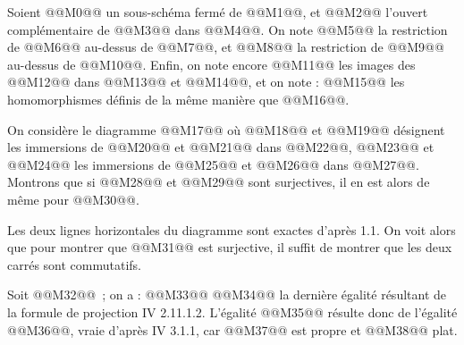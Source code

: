
Soient @@M0@@ un sous-schéma fermé de @@M1@@, et @@M2@@ l'ouvert complémentaire de @@M3@@ dans @@M4@@. On note @@M5@@ la restriction de @@M6@@ au-dessus de @@M7@@, et @@M8@@ la restriction de @@M9@@ au-dessus de @@M10@@. Enfin, on note encore @@M11@@ les images des @@M12@@ dans @@M13@@ et @@M14@@, et on note :
@@M15@@
les homomorphismes définis de la même manière que @@M16@@.

On considère le diagramme
@@M17@@
où @@M18@@ et @@M19@@ désignent les immersions de @@M20@@ et @@M21@@ dans @@M22@@, @@M23@@ et @@M24@@ les immersions de @@M25@@ et @@M26@@ dans @@M27@@. Montrons que si @@M28@@ et @@M29@@ sont surjectives, il en est alors de même pour @@M30@@.

Les deux lignes horizontales du diagramme sont exactes d'après 1.1. On voit alors que pour montrer que @@M31@@ est surjective, il suffit de montrer que les deux carrés sont commutatifs.

Soit @@M32@@~; on a :
@@M33@@
@@M34@@
la dernière égalité résultant de la formule de projection IV 2.11.1.2. L'égalité @@M35@@ résulte donc de l'égalité @@M36@@, vraie d'après IV 3.1.1, car @@M37@@ est
propre et @@M38@@ plat.


